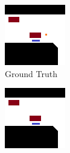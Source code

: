 \begin{figure}[h]
	\centering
	\begin{subfigure}[t]{0.25\linewidth}
		\includegraphics[width=\linewidth]{Figures/Res_Prop/GT_colloquium}
		\caption{Ground Truth}
		\label{fig:met_crit_gt2}
	\end{subfigure} \hfil
	\begin{subfigure}[t]{0.25\linewidth}
		\includegraphics[width=\linewidth]{Figures/Res_Prop/local_error_colloquium}

\end{subfigure}
\end{figure}

